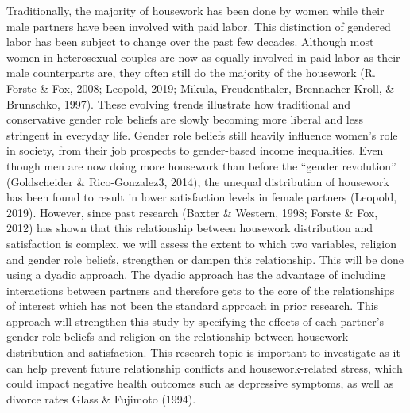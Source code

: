 \documentclass[
  man,floatsintext]{apa6}
\begin{document}
Traditionally, the majority of housework has been done by women while their male partners have been involved with paid labor. This distinction of gendered labor has been subject to change over the past few decades. Although most women in heterosexual couples are now as equally involved in paid labor as their male counterparts are, they often still do the majority of the housework (R. Forste \& Fox, 2008; Leopold, 2019; Mikula, Freudenthaler, Brennacher-Kroll, \& Brunschko, 1997). These evolving trends illustrate how traditional and conservative gender role beliefs are slowly becoming more liberal and less stringent in everyday life. Gender role beliefs still heavily influence women's role in society, from their job prospects to gender-based income inequalities. Even though men are now doing more housework than before the ``gender revolution'' (Goldscheider \& Rico-Gonzalez3, 2014), the unequal distribution of housework has been found to result in lower satisfaction levels in female partners (Leopold, 2019). However, since past research (Baxter \& Western, 1998; Forste \& Fox, 2012) has shown that this relationship between housework distribution and satisfaction is complex, we will assess the extent to which two variables, religion and gender role beliefs, strengthen or dampen this relationship.
This will be done using a dyadic approach. The dyadic approach has the advantage of including interactions between partners and therefore gets to the core of the relationships of interest which has not been the standard approach in prior research. This approach will strengthen this study by specifying the effects of each partner's gender role beliefs and religion on the relationship between housework distribution and satisfaction.
This research topic is important to investigate as it can help prevent future relationship conflicts and housework-related stress, which could impact negative health outcomes such as depressive symptoms, as well as divorce rates Glass \& Fujimoto (1994).
\end{document}

